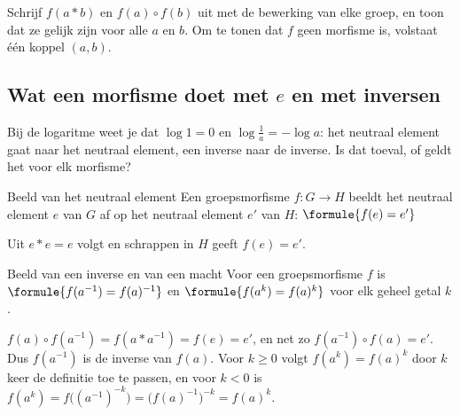 \begin{werkwijze}
Schrijf $f(a \ast b)$ en $f(a) \circ f(b)$ uit met de bewerking van elke groep, en toon dat ze gelijk zijn voor alle $a$ en $b$. Om te tonen dat $f$ geen morfisme is, volstaat één koppel $(a, b)$.
\end{werkwijze}

\begin{oefeningen}
\end{oefeningen}

\subsection{Wat een morfisme doet met $e$ en met inversen}

Bij de logaritme weet je dat $\log 1 = 0$ en $\log \frac1a = -\log a$: het neutraal element gaat naar het neutraal element, een inverse naar de inverse. Is dat toeval, of geldt het voor elk morfisme?

\begin{theorie}
\begin{stelling}{Beeld van het neutraal element}
Een groepsmorfisme $f \colon G \to H$ beeldt het neutraal element $e$ van $G$ af op het neutraal element $e'$ van $H$: \qquad $\formule{f(e) = e'}$
\end{stelling}

\begin{bewijs}
Uit $e \ast e = e$ volgt
en schrappen in $H$ geeft $f(e) = e'$.
\end{bewijs}
\end{theorie}

\begin{theorie}
\begin{stelling}{Beeld van een inverse en van een macht}
Voor een groepsmorfisme $f$ is \qquad $\formule{f(a^{-1}) = f(a)^{-1}}$ \qquad en \qquad $\formule{f(a^k) = f(a)^k}$ \quad voor elk geheel getal $k$.
\end{stelling}

\begin{bewijs}
$f(a) \circ f(a^{-1}) = f(a \ast a^{-1}) = f(e) = e'$, en net zo $f(a^{-1}) \circ f(a) = e'$. Dus $f(a^{-1})$ is de inverse van $f(a)$. Voor $k \geqslant 0$ volgt $f(a^k) = f(a)^k$ door $k$ keer de definitie toe te passen, en voor $k < 0$ is $f(a^k) = f\bigl((a^{-1})^{-k}\bigr) = \bigl(f(a)^{-1}\bigr)^{-k} = f(a)^k$.
\end{bewijs}
\end{theorie}

